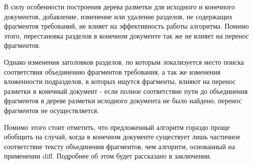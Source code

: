 В силу особенности построения дерева разметки для исходного и конечного документов, добавление, изменение или удаление разделов, не содержащих фрагментов требований, не влияет на эффективность работы алгоритма. Помимо этого, перестановка разделов в конечном документе так же не влияет на перенос фрагментов. 

Однако изменения заголовков разделов, по которым локализуется место поиска соответствия объединению фрагментов требования, а так же изменения вложенности подразделов, в которых ищутся фрагменты, влияют на перенос разметки в конечный документ - если полное соответствие пути до объединения фрагментов в дереве разметки исходного документа не было найдено, перенос фрагментов не осуществляется.

Помимо этого стоит отметить, что предложенный алгоритм гораздо проще обобщить на случай, когда в конечном документе существует лишь частичное соответствие тексту объединения фрагментов, чем алгоритм, основанный на применении diff. Подробнее об этом будет рассказано в заключении.